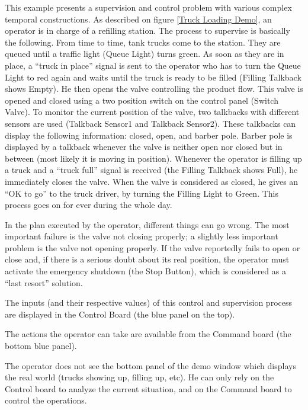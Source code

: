 
This example presents a supervision and control problem with various complex
temporal constructions. As described on figure \ref{Truck Loading Demo}, an
operator is in charge of a refilling station. The process to supervise is
basically the following.  From time to time, tank trucks come to the station.
They are queued until a traffic light (Queue Light) turns green. As soon as
they are in place, a ``truck in place'' signal is sent to the operator who has
to turn the Queue Light to red again and waits until the truck is ready to be
filled (Filling Talkback shows Empty). He then opens the valve controlling the
product flow.  This valve is opened and closed using a two position switch on
the control panel (Switch Valve). To monitor the current position of the valve,
two talkbacks with different sensors are used (Talkback Sensor1 and Talkback
Sensor2). These talkbacks can display the following information: closed, open,
and barber pole.  Barber pole is displayed by a talkback whenever the valve is
neither open nor closed but in between (most likely it is moving in position).
Whenever the operator is filling up a truck and a ``truck full'' signal is
received (the Filling Talkback shows Full), he immediately closes the valve.
When the valve is considered as closed, he gives an ``OK to go'' to the truck
driver, by turning the Filling Light to Green. This process goes on for ever
during the whole day.

In the plan executed by the operator, different things can go wrong. The most
important failure is the valve not closing properly; a slightly less important
problem is the valve not opening properly. If the valve reportedly fails to
open or close and, if there is a serious doubt about its real position, the
operator must activate the emergency shutdown (the Stop Button), which is
considered as a ``last resort'' solution.

The inputs (and their respective values) of this control and supervision
process are displayed in the Control Board (the blue panel on the top).

The actions the operator can take are available from the Command board (the
bottom blue panel).

The operator does not see the bottom panel of the demo window which displays
the real world (trucks showing up, filling up, etc). He can only rely on the
Control board to analyze the current situation, and on the Command board to
control the operations.

